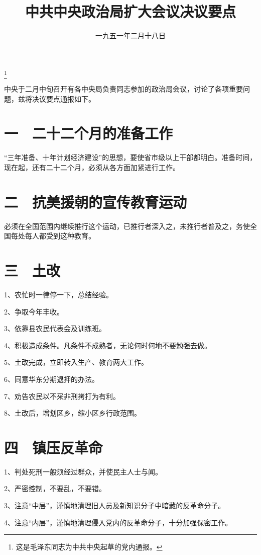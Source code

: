 
\title{中共中央政治局扩大会议决议要点}
\date{一九五一年二月十八日}
\thanks{这是毛泽东同志为中共中央起草的党内通报。}
\maketitle


中央于二月中旬召开有各中央局负责同志参加的政治局会议，讨论了各项重要问题，兹将决议要点通报如下。

\section{一　二十二个月的准备工作}

“三年准备、十年计划经济建设”的思想，要使省市级以上干部都明白。准备时间，现在起，还有二十二个月，必须从各方面加紧进行工作。

\section{二　抗美援朝的宣传教育运动}

必须在全国范围内继续推行这个运动，已推行者深入之，未推行者普及之，务使全国每处每人都受到这种教育。

\section{三　土改}

1、农忙时一律停一下，总结经验。

2、争取今年丰收。

3、依靠县农民代表会及训练班。

4、积极造成条件。凡条件不成熟者，无论何时何地不要勉强去做。

5、土改完成，立即转入生产、教育两大工作。

6、同意华东分期退押的办法。

7、劝告农民以不采非刑拷打为有利。

8、土改后，增划区乡，缩小区乡行政范围。

\section{四　镇压反革命}

1、判处死刑一般须经过群众，并使民主人士与闻。

2、严密控制，不要乱，不要错。

3、注意“中层”，谨慎地清理旧人员及新知识分子中暗藏的反革命分子。

4、注意“内层”，谨慎地清理侵入党内的反革命分子，十分加强保密工作。

